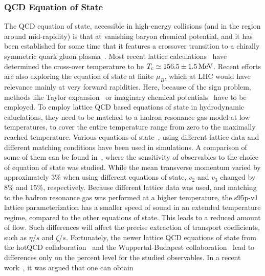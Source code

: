 \subsubsection{QCD Equation of State}
The QCD equation of state, accessible in high-energy collisions (and in 
  the region around mid-rapidity) is that at vanishing baryon chemical 
  potential, and it has been established for some time that it features 
  a crossover transition to a chirally symmetric quark gluon plasma~\cite{Aoki:2006we}. 
Most recent lattice calculations~\cite{Steinbrecher:2018phh} have determined 
  the cross-over temperature to be $T_c\simeq 156.5 \pm 1.5\,{\rm MeV}$. 
Recent efforts are also exploring the equation of state at finite $\mu_B$, 
  which at LHC would have relevance mainly at very forward rapidities. 
Here, because of the sign problem, methods like Taylor expansion~\cite{Kaczmarek:2011zz,Endrodi:2011gv,Bazavov:2015zja,Bonati:2018nut} 
  or imaginary chemical potentials~\cite{Cea:2014xva,Bonati:2014kpa,Bonati:2015bha,Bellwied:2015rza,Cea:2015cya} 
  have to be employed. 
To employ lattice QCD based equations of state in hydrodynamic caluclations, 
  they need to be matched to a hadron resonance gas model at low temperatures, 
  to cover the entire temperature range from zero to the maximally 
  reached temperature. 
Various equations of state~\cite{Huovinen:2009yb, Borsanyi:2013bia, Bazavov:2014pvz}, 
  using different lattice data and different matching conditions have been used 
  in simulations. 
A comparison of some of them can be found in~\cite{Moreland:2015dvc}, where 
  the sensitivity of observables to the choice of equation of state 
  was studied. 
While the mean transverse momentum varied by approximately 3\% when using 
  different equations of state, $v_2$ and $v_3$ changed by 8\% and 15\%, 
  respectively.
Because different lattice data was used, and matching to the hadron resonance 
  gas was performed at a higher temperature, the s95p-v1 lattice 
  parameterization has a smaller speed of sound in an extended temperature 
  regime, compared to the other equations of state. 
This leads to a reduced amount of flow. 
Such differences will affect the precise extraction of transport coefficients, 
  such as $\eta/s$ and $\zeta/s$. 
Fortunately, the newer lattice QCD equations of state from the hotQCD 
  collaboration~\cite{Bazavov:2014pvz} and the Wuppertal-Budapest 
  collaboration~\cite{Borsanyi:2013bia} lead to differences only on the 
  percent level for the studied observables.
In a recent work~\cite{Monnai:2017cbv}, it was argued that one can obtain 
